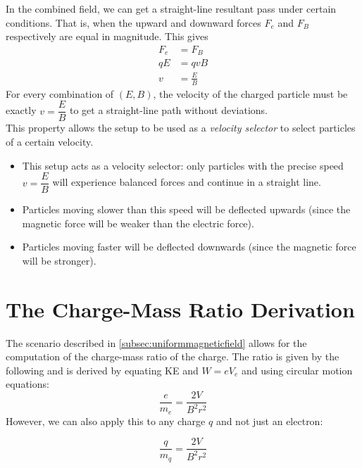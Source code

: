 \documentclass[a4paper,12pt]{article}
\let\oldsection\section
\renewcommand\section{\clearpage\oldsection}
\newcommand{\lb}{\\[8pt]}
\begin{document}
In the combined field, we can get a straight-line resultant pass under certain conditions. That is, when the upward and downward forces $F_e$ and $F_B$ respectively are equal in magnitude. This gives \begin{align*}
  F_e & = F_B         \\
  qE  & = qvB         \\
  v   & = \frac{E}{B}
\end{align*}
For every combination of $(E, B)$, the velocity of the charged particle must be exactly $v = \dfrac{E}{B}$ to get a straight-line path without deviations.\lb
This property allows the setup to be used as a \textit{velocity selector} to select particles of a certain velocity.
\begin{itemize}
  \item This setup acts as a velocity selector: only particles with the precise speed $v = \dfrac{E}{B}$ will experience balanced forces and continue in a straight line.
  \item Particles moving slower than this speed will be deflected upwards (since the magnetic force will be weaker than the electric force).
  \item Particles moving faster will be deflected downwards (since the magnetic force will be stronger).
\end{itemize}


\section{The Charge-Mass Ratio Derivation}
The scenario described in \cref{subsec:uniformmagneticfield} allows for the computation of the charge-mass ratio of the charge. The ratio is given by the following and is derived by equating KE and $W = eV_e$ and using circular motion equations:
\begin{equation}
  \frac{e}{m_e} = \frac{2V}{B^2r^2}
\end{equation}
However, we can also apply this to any charge $q$ and not just an electron:

\begin{equation}
  \frac{q}{m_q} = \frac{2V}{B^2r^2}
\end{equation}
\end{document}
